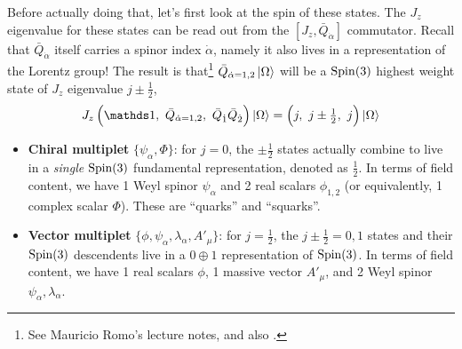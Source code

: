 \documentclass[a4paper
	,10pt
]{article}
\begin{document}
	Before actually doing that, let's first look at the spin of these states. 
	The $J_z$ eigenvalue for these states can be read out from the $[J_z,\bar{Q}_{\dot{\alpha}}]$ commutator. Recall that $\bar{Q}_{\dot{\alpha}}$ itself carries a spinor index $\dot{\alpha}$, namely it also lives in a representation of the Lorentz group! 
	The result is that\footnote{
		See Mauricio Romo's lecture notes, and also \cite{Terning:2006bq}. 
	} $\bar{Q}_{\dot{\alpha}=1,2} \ket{\Omega}$ will be a $\mathrm{Spin}(3)$ highest weight state of $J_z$ eigenvalue $j \pm \frac{1}{2}$,
	\begin{equation}
		J_z\,\pqty\Big{
			\idty,
			\ \bar{Q}_{\dot{\alpha}=1,2},
			\ \bar{Q}_{\dot{1}}\bar{Q}_{\dot{2}}
		} \ket{\Omega} = \pqty\Big{
			j,\ j\pm\tfrac{1}{2},\ j
		} \ket{\Omega}
	\end{equation}
	
	\begin{itemize}[label=--]
	\item \textbf{Chiral multiplet} $\{\psi_\alpha, \Phi\}$: for $j = 0$, the $\pm\frac{1}{2}$ states actually combine to live in a \textit{single} $\mathrm{Spin}(3)$ fundamental representation, denoted as $\frac{1}{2}$. 
	In terms of field content, we have 1 Weyl spinor $\psi_\alpha$ and 2 real scalars $\phi_{1,2}$ (or equivalently, 1 complex scalar $\Phi$). These are ``quarks'' and ``squarks''. 
	
	\item \textbf{Vector multiplet} $
		\{\phi,\psi_\alpha,\lambda_\alpha,A'_\mu\}
	$: for $j = \frac{1}{2}$, the $j\pm\frac{1}{2} = 0,1$ states and their $\mathrm{Spin}(3)$ descendents live in a $0\oplus 1$ representation of $\mathrm{Spin}(3)$. 
	In terms of field content, we have 1 real scalars $\phi$, 1 massive vector $A'_\mu$, and 2 Weyl spinor $\psi_\alpha, \lambda_\alpha$. 
	\end{itemize}
	
\end{document}
